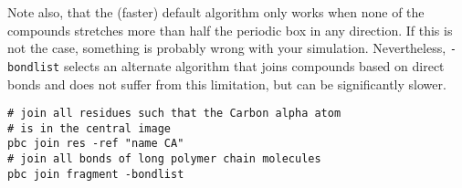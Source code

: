 \documentclass[a4paper, DIV12]{scrartcl}
\begin{document}
Note also, that the (faster) default algorithm only works when none of
the compounds stretches more than half the periodic box in any direction.
If this is not the case, something is probably wrong with your simulation.
Nevertheless, \texttt{-bondlist} selects an alternate algorithm
that joins compounds based on direct bonds and does not suffer from this
limitation, but can be significantly slower.


\begin{Verbatim}
# join all residues such that the Carbon alpha atom 
# is in the central image
pbc join res -ref "name CA"
# join all bonds of long polymer chain molecules
pbc join fragment -bondlist
\end{Verbatim}

\end{document}
